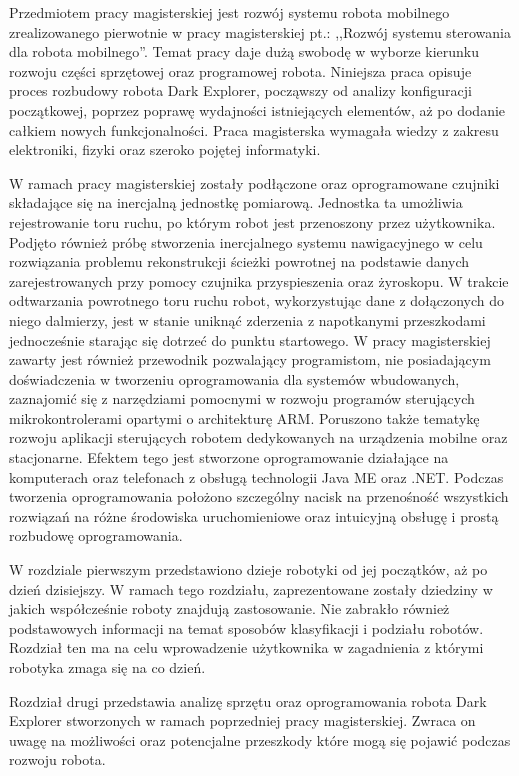 Przedmiotem pracy magisterskiej jest rozwój systemu robota mobilnego zrealizowanego pierwotnie w pracy magisterskiej pt.: ,,Rozwój systemu sterowania dla robota mobilnego''\cite{KmakMScThesis2009}. Temat pracy daje dużą swobodę w wyborze kierunku rozwoju części sprzętowej oraz programowej robota. Niniejsza praca opisuje proces rozbudowy robota Dark Explorer, począwszy od analizy konfiguracji początkowej, poprzez poprawę wydajności istniejących elementów, aż po dodanie całkiem nowych funkcjonalności. Praca magisterska wymagała wiedzy z zakresu elektroniki, fizyki oraz szeroko pojętej informatyki. 

W ramach pracy magisterskiej zostały podłączone oraz oprogramowane czujniki składające się na inercjalną jednostkę pomiarową. Jednostka ta umożliwia rejestrowanie toru ruchu, po którym robot jest przenoszony przez użytkownika. Podjęto również próbę stworzenia inercjalnego systemu nawigacyjnego w celu rozwiązania problemu rekonstrukcji ścieżki powrotnej na podstawie danych zarejestrowanych przy pomocy czujnika przyspieszenia oraz żyroskopu. W trakcie odtwarzania powrotnego toru ruchu robot, wykorzystując dane z dołączonych do niego dalmierzy, jest w stanie uniknąć zderzenia z napotkanymi przeszkodami jednocześnie starając się dotrzeć do punktu startowego. W pracy magisterskiej zawarty jest również przewodnik pozwalający programistom, nie posiadającym doświadczenia w tworzeniu oprogramowania dla systemów wbudowanych, zaznajomić się z narzędziami pomocnymi w rozwoju programów sterujących mikrokontrolerami opartymi o architekturę ARM. Poruszono także tematykę rozwoju aplikacji sterujących robotem dedykowanych na urządzenia mobilne oraz stacjonarne. Efektem tego jest stworzone oprogramowanie działające na komputerach oraz telefonach z obsługą technologii Java ME oraz .NET. Podczas tworzenia oprogramowania położono szczególny nacisk na przenośność wszystkich rozwiązań na różne środowiska uruchomieniowe oraz intuicyjną obsługę i prostą rozbudowę oprogramowania.

W rozdziale pierwszym przedstawiono dzieje robotyki od jej początków, aż po dzień dzisiejszy. W ramach tego rozdziału, zaprezentowane zostały dziedziny w jakich współcześnie roboty znajdują zastosowanie. Nie zabrakło również podstawowych informacji na temat sposobów klasyfikacji i podziału robotów. Rozdział ten ma na celu wprowadzenie użytkownika w zagadnienia z którymi robotyka zmaga się na co dzień.

Rozdział drugi przedstawia analizę sprzętu oraz oprogramowania robota Dark Explorer stworzonych w ramach poprzedniej pracy magisterskiej. Zwraca on uwagę na możliwości oraz potencjalne przeszkody które mogą się pojawić podczas rozwoju robota. 

